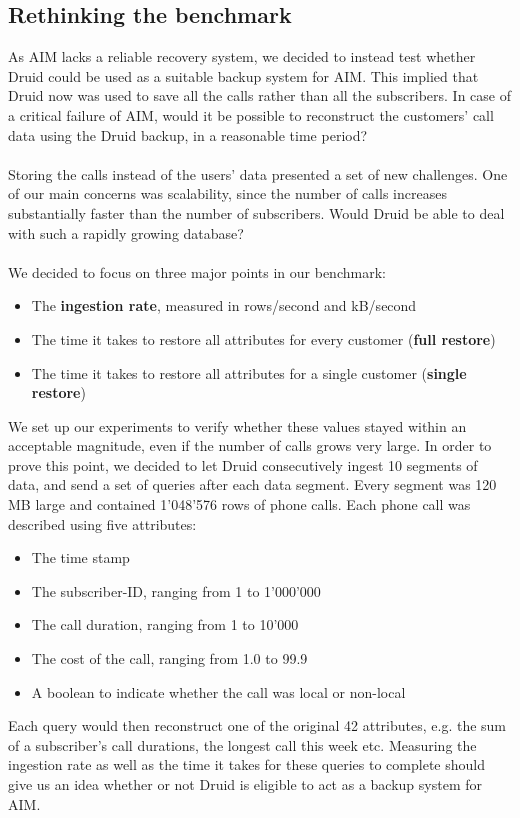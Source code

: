 \documentclass[11pt,singlecolumn]{scrartcl}
\begin{document}
\subsection{Rethinking the benchmark}
As AIM lacks a reliable recovery system, we decided to instead test whether Druid could be used as a suitable backup system for AIM. This implied that Druid now was used to save all the calls rather than all the subscribers. In case of a critical failure of AIM, would it be possible to reconstruct the customers' call data using the Druid backup, in a reasonable time period?\\\\
Storing the calls instead of the users' data presented a set of new challenges. One of our main concerns was scalability, since the number of calls increases substantially faster than the number of subscribers. Would Druid be able to deal with such a rapidly growing database?\\\\We decided to focus on three major points in our benchmark:
\begin{itemize}

 \item The \textbf{ingestion rate}, measured in rows/second and kB/second
 \item The time it takes to restore all attributes for every customer (\textbf{full restore})
 \item The time it takes to restore all attributes for a single customer (\textbf{single restore})
\end{itemize}
We set up our experiments to verify whether these values stayed within an acceptable magnitude, even if the number of calls grows very large. In order to prove this point, we decided to let Druid consecutively ingest 10 segments of data, and send a set of queries after each data segment. Every segment was 120 MB large and contained 1'048'576 rows of phone calls. Each phone call was described using five attributes:
\begin{itemize}

 \item  The time stamp
 \item  The subscriber-ID, ranging from 1 to 1'000'000
 \item  The call duration, ranging from 1 to 10'000
 \item  The cost of the call, ranging from 1.0 to 99.9
 \item  A boolean to indicate whether the call was local or non-local
\end{itemize}
Each query would then reconstruct one of the original 42 attributes, e.g. the sum of a subscriber's call durations, the longest call this week etc. Measuring the ingestion rate as well as the time it takes for these queries to complete should give us an idea whether or not Druid is eligible to act as a backup system for AIM. 
\end{document}
